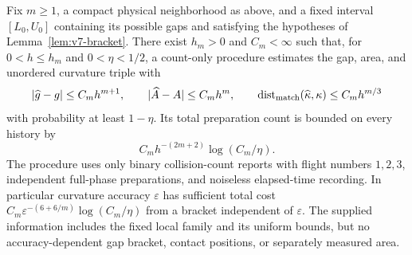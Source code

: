 \begin{theorem}
\label{thm:v7-fixed-bracket}
Fix $m\ge1$, a compact physical neighborhood as above, and a fixed
interval $[L_0,U_0]$ containing its possible gaps and satisfying the
hypotheses of Lemma~\ref{lem:v7-bracket}. There exist $h_m>0$ and
$C_m<\infty$ such that, for $0<h\le h_m$ and $0<\eta<1/2$, a
count-only procedure estimates the gap, area, and unordered curvature
triple with
\begin{equation}\label{eq:v7-fixed-bracket-errors}
 |\widehat g-g|\le C_mh^{m+1},\qquad
 |\widehat A-A|\le C_mh^m,\qquad
 \operatorname{dist}_{\rm match}(\widehat\kappa,\kappa)
                                      \le C_mh^{m/3}
\end{equation}
with probability at least $1-\eta$. Its total preparation count is
bounded on every history by
\begin{equation}\label{eq:v7-fixed-bracket-cost}
 C_m h^{-(2m+2)}\log(C_m/\eta).
\end{equation}
The procedure uses only binary collision-count reports with flight
numbers $1,2,3$, independent full-phase preparations, and noiseless
elapsed-time recording. In particular curvature accuracy $\varepsilon$
has sufficient total cost
$C_m\varepsilon^{-(6+6/m)}\log(C_m/\eta)$ from a bracket independent
of $\varepsilon$. The supplied information includes the fixed local
family and its uniform bounds, but no accuracy-dependent gap bracket,
contact positions, or separately measured area.
\end{theorem}
